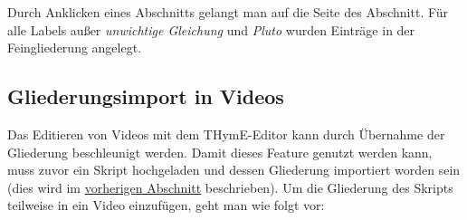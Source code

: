 \documentclass[parskip=off,index=totocnumbered]{scrartcl}
\newenvironment{rückkeinstück2}
	{\begin{adjustwidth}{0cm}{0cm}\footnotesize \singlespace} 
	{\end{adjustwidth} \onehalfspacing}
\begin{document}
\noindent \begin{minipage}{\textwidth}
    \begin{rückkeinstück2}
        Durch Anklicken eines Abschnitts gelangt man auf die Seite des Abschnitt. Für alle Labels außer \textit{unwichtige Gleichung} und \textit{Pluto} wurden Einträge in der Feingliederung angelegt.
    \end{rückkeinstück2}
\end{minipage}

              
\subsection{Gliederungsimport in Videos}
Das Editieren von Videos mit dem THymE-Editor kann durch Übernahme der Gliederung beschleunigt werden. Damit dieses Feature genutzt werden kann, muss zuvor ein Skript hochgeladen und dessen Gliederung importiert worden sein (dies wird im \hyperref[sec:extract]{vorherigen Abschnitt} beschrieben). Um die Gliederung des Skripts teilweise in ein Video einzufügen, geht man wie folgt vor:
\end{document}
